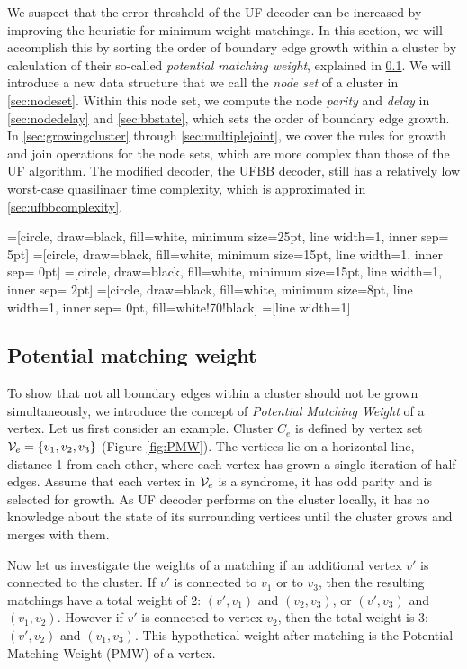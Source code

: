 We suspect that the error threshold of the UF decoder can be increased by improving the heuristic for minimum-weight matchings. In this section, we will accomplish this by sorting the order of boundary edge growth within a cluster by calculation of their so-called \emph{potential matching weight}, explained in \ref{sec:PMW}. We will introduce a new data structure that we call the \emph{node set} of a cluster in \ref{sec:nodeset}. Within this node set, we compute the node \emph{parity} and \emph{delay} in \ref{sec:nodedelay} and \ref{sec:bbstate}, which sets the order of boundary edge growth. In \ref{sec:growingcluster} through \ref{sec:multiplejoint}, we cover the rules for growth and join operations for the node sets, which are more complex than those of the UF algorithm. The modified decoder, the UFBB decoder, still has a relatively low worst-case quasilinaer time complexity, which is approximated in \ref{sec:ufbbcomplexity}.


=[circle, draw=black, fill=white, minimum size=25pt, line width=1, inner sep= 5pt]
=[circle, draw=black, fill=white, minimum size=15pt, line width=1, inner sep= 0pt]
=[circle, draw=black, fill=white, minimum size=15pt, line width=1, inner sep= 2pt]
=[circle, draw=black, fill=white, minimum size=8pt, line width=1, inner sep= 0pt, fill=white!70!black]
=[line width=1]
\tikzfading[name=fade right, left color=transparent!0, right color=transparent!100]


\subsection{Potential matching weight}\label{sec:PMW}

To show that not all boundary edges within a cluster should not be grown simultaneously, we introduce the concept of \emph{Potential Matching Weight} of a vertex. Let us first consider an example. Cluster $C_e$ is defined by vertex set $\mathcal{V}_e = \{v_1, v_2, v_3\}$ (Figure \ref{fig:PMW}). The vertices lie on a horizontal line, distance 1 from each other, where each vertex has grown a single iteration of half-edges. Assume that each vertex in $\mathcal{V}_e$ is a syndrome, it has odd parity and is selected for growth. As UF decoder performs on the cluster locally, it has no knowledge about the state of its surrounding vertices until the cluster grows and merges with them. 

Now let us investigate the weights of a matching if an additional vertex $v'$ is connected to the cluster.
If $v'$ is connected to $v_1$ or to $v_3$, then the resulting matchings have a total weight of 2: $(v',v_1)$ and $(v_2,v_3)$, or $(v',v_3)$ and $(v_1,v_2)$. However if $v'$ is connected to vertex $v_2$, then the total weight is 3: $(v', v_2)$ and $(v_1, v_3)$. This hypothetical weight after matching is the Potential Matching Weight (PMW) of a vertex.

